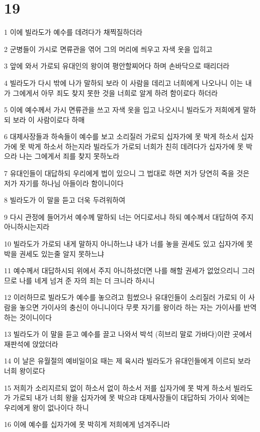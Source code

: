\chapter{19}

\par 1 이에 빌라도가 예수를 데려다가 채찍질하더라
\par 2 군병들이 가시로 면류관을 엮어 그의 머리에 씌우고 자색 옷을 입히고
\par 3 앞에 와서 가로되 유대인의 왕이여 평안할찌어다 하며 손바닥으로 때리더라
\par 4 빌라도가 다시 밖에 나가 말하되 보라 이 사람을 데리고 너희에게 나오나니 이는 내가 그에게서 아무 죄도 찾지 못한 것을 너희로 알게 하려 함이로다 하더라
\par 5 이에 예수께서 가시 면류관을 쓰고 자색 옷을 입고 나오시니 빌라도가 저희에게 말하되 보라 이 사람이로다 하매
\par 6 대제사장들과 하속들이 예수를 보고 소리질러 가로되 십자가에 못 박게 하소서 십자가에 못 박게 하소서 하는지라 빌라도가 가로되 너희가 친히 데려다가 십자가에 못 박으라 나는 그에게서 죄를 찾지 못하노라
\par 7 유대인들이 대답하되 우리에게 법이 있으니 그 법대로 하면 저가 당연히 죽을 것은 저가 자기를 하나님 아들이라 함이니이다
\par 8 빌라도가 이 말을 듣고 더욱 두려워하여
\par 9 다시 관정에 들어가서 예수께 말하되 너는 어디로서냐 하되 예수께서 대답하여 주지 아니하시는지라
\par 10 빌라도가 가로되 내게 말하지 아니하느냐 내가 너를 놓을 권세도 있고 십자가에 못 박을 권세도 있는줄 알지 못하느냐
\par 11 예수께서 대답하시되 위에서 주지 아니하셨더면 나를 해할 권세가 없었으리니 그러므로 나를 네게 넘겨 준 자의 죄는 더 크니라 하시니
\par 12 이러하므로 빌라도가 예수를 놓으려고 힘썼으나 유대인들이 소리질러 가로되 이 사람을 놓으면 가이사의 충신이 아니니이다 무릇 자기를 왕이라 하는 자는 가이사를 반역하는 것이니이다
\par 13 빌라도가 이 말을 듣고 예수를 끌고 나와서 박석 (히브리 말로 가바다)이란 곳에서 재판석에 앉았더라
\par 14 이 날은 유월절의 예비일이요 때는 제 육시라 빌라도가 유대인들에게 이르되 보라 너희 왕이로다
\par 15 저희가 소리지르되 없이 하소서 없이 하소서 저를 십자가에 못 박게 하소서 빌라도가 가로되 내가 너희 왕을 십자가에 못 박으랴 대제사장들이 대답하되 가이사 외에는 우리에게 왕이 없나이다 하니
\par 16 이에 예수를 십자가에 못 박히게 저희에게 넘겨주니라
